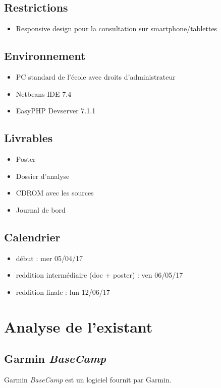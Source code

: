 \documentclass[a4paper]{article}
\begin{document}
\subsection{Restrictions}
\begin{itemize}
	\item Responsive design pour la consultation sur smartphone/tablettes
\end{itemize}



\subsection{Environnement}
\begin{itemize}
	\item PC standard de l'école avec droits d'administrateur
	\item Netbeans IDE 7.4
	\item EasyPHP Devserver 7.1.1
\end{itemize}

\subsection{Livrables}
\begin{itemize}
	\item Poster
	\item Dossier d'analyse
	\item CDROM avec les sources
	\item Journal de bord
\end{itemize}

\subsection{Calendrier}
\begin{itemize}
	\item début : mer 05/04/17
	\item reddition intermédiaire (doc + poster) : ven 06/05/17
	\item reddition finale : lun 12/06/17
\end{itemize}


\pagebreak

\section{Analyse de l'existant}


\subsection{Garmin \emph{BaseCamp}}
Garmin \emph{BaseCamp} est un logiciel fournit par Garmin.
\end{document}
